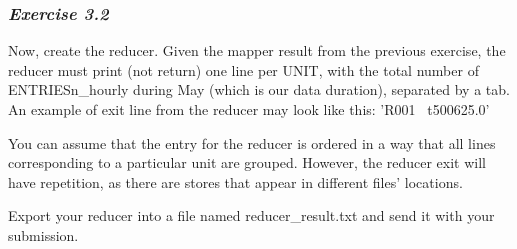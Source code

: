 \documentclass[11pt]{article}
\begin{document}
    \subsubsection{\texorpdfstring{\emph{Exercise
3.2}}{Exercise 3.2}}\label{exercise-3.2}

Now, create the reducer. Given the mapper result from the previous
exercise, the reducer must print (not return) one line per UNIT, with
the total number of ENTRIESn\_hourly during May (which is our data
duration), separated by a tab. An example of exit line from the reducer
may look like this: 'R001 ~t500625.0'

You can assume that the entry for the reducer is ordered in a way that
all lines corresponding to a particular unit are grouped. However, the
reducer exit will have repetition, as there are stores that appear in
different files' locations.

Export your reducer into a file named reducer\_result.txt and send it
with your submission.
\end{document}
